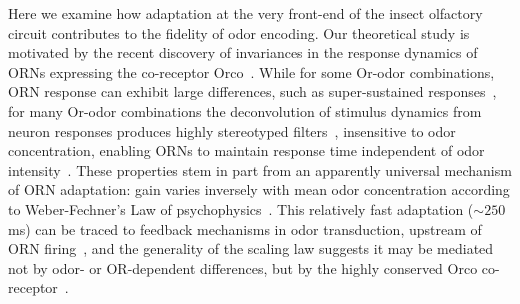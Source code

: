 \documentclass[9pt,twocolumn,twoside,lineno]{pnas-new}
\begin{document}
Here we examine how adaptation at the very front-end of the insect olfactory circuit contributes to the fidelity of odor encoding. Our theoretical study is motivated by the recent discovery of invariances in the response dynamics of ORNs expressing the co-receptor Orco~\cite{Orco, srinivas_elife, cafaro_WL, cao_WL}. While for some Or-odor combinations, ORN response can exhibit large differences, such as super-sustained responses~\cite{montague2011similar}, for many Or-odor combinations the deconvolution of stimulus dynamics from neuron responses produces highly stereotyped filters~\cite{martelli}, insensitive to odor concentration, enabling ORNs to maintain response time independent of odor intensity~\cite{martelli, srinivas_elife, si2017invariances}. %
These properties stem in part from an apparently universal mechanism of ORN adaptation: gain varies inversely with mean odor concentration according to Weber-Fechner's Law of psychophysics~\cite{weber1996eh,fechner2012elemente,srinivas_elife,cafaro_WL,cao_WL}. This relatively fast adaptation ($\sim 250$ ms) can be traced to feedback mechanisms in odor transduction, upstream of ORN firing~\cite{nagel_wilson_biophysical,cao_WL,cafaro_WL,srinivas_elife}, and the generality of the scaling law suggests it may be mediated not by odor- or OR-dependent differences, but by the highly conserved Orco co-receptor~\cite{Orco,getahun2013insect,getahun2016intracellular,orco_structure}. %
\end{document}
